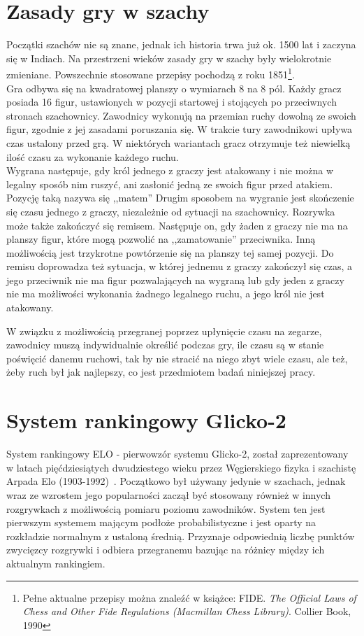 \documentclass[inzynierska]{pwr_wmat_praca_dyplomowa}
\theoremstyle{plain}
\numberwithin{theorem}{chapter}
\theoremstyle{definition}
\numberwithin{theorem}{chapter}
\begin{document}
\section{Zasady gry w szachy}
Początki szachów nie są znane, jednak ich historia trwa już ok. 1500 lat i zaczyna się w Indiach. Na przestrzeni wieków zasady gry w szachy były wielokrotnie zmieniane. Powszechnie stosowane przepisy pochodzą z roku 1851\footnote{Pełne aktualne przepisy można znaleźć w książce: FIDE. \textit{The Official Laws of Chess and Other Fide Regulations (Macmillan Chess Library)}. Collier Book, 1990}.\\

Gra odbywa się na kwadratowej planszy o wymiarach 8 na 8 pól. Każdy gracz posiada 16 figur, ustawionych w pozycji startowej i stojących po przeciwnych stronach szachownicy. Zawodnicy wykonują na przemian ruchy dowolną ze swoich figur, zgodnie z jej zasadami poruszania się. W trakcie tury zawodnikowi upływa czas ustalony przed grą. W niektórych wariantach gracz otrzymuje też niewielką ilość czasu za wykonanie każdego ruchu.\\

Wygrana następuje, gdy król jednego z graczy jest atakowany i nie można w legalny sposób nim ruszyć, ani zasłonić jedną ze swoich figur przed atakiem. Pozycję taką nazywa się ,,matem'' Drugim sposobem na wygranie jest skończenie się czasu jednego z graczy, niezależnie od sytuacji na szachownicy. 
Rozrywka może także zakończyć się remisem. Następuje on, gdy żaden z graczy nie ma na planszy figur, które mogą pozwolić na ,,zamatowanie'' przeciwnika. Inną możliwością jest trzykrotne powtórzenie się na planszy tej samej pozycji. Do remisu doprowadza też sytuacja, w której jednemu z graczy zakończył się czas, a jego przeciwnik nie ma figur pozwalających na wygraną lub gdy jeden z graczy nie ma możliwości wykonania żadnego legalnego ruchu, a jego król nie jest atakowany.

W związku z możliwością przegranej poprzez upłynięcie czasu na zegarze, zawodnicy muszą indywidualnie określić podczas gry, ile czasu są w stanie poświęcić danemu ruchowi, tak by nie stracić na niego zbyt wiele czasu, ale też, żeby ruch był jak najlepszy, co jest przedmiotem badań niniejszej pracy.

\section{System rankingowy Glicko-2}
System rankingowy ELO - pierwowzór systemu Glicko-2, został zaprezentowany w latach pięćdziesiątych dwudziestego wieku przez Węgierskiego fizyka i szachistę Arpada Elo (1903-1992)~\cite[rozdział 1]{elo}. Początkowo był używany jedynie w szachach, jednak wraz ze wzrostem jego popularności zaczął być stosowany również w innych rozgrywkach z możliwością pomiaru poziomu zawodników. System ten jest pierwszym systemem mającym podłoże probabilistyczne i jest oparty na rozkładzie normalnym z ustaloną średnią. Przyznaje odpowiednią liczbę punktów zwycięzcy rozgrywki i odbiera przegranemu bazując na różnicy między ich aktualnym rankingiem.
\end{document}

